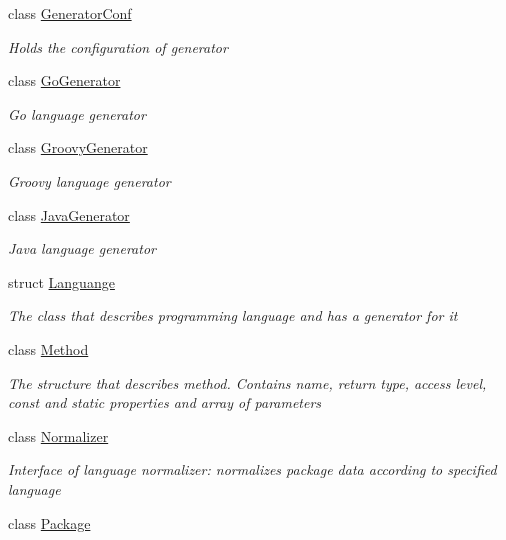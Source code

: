 \begin{DoxyCompactItemize}
class \mbox{\hyperlink{classCodeGen_1_1generators_1_1GeneratorConf}{Generator\+Conf}}
\begin{DoxyCompactList}\small\item\em Holds the configuration of generator \end{DoxyCompactList}\item 
class \mbox{\hyperlink{classCodeGen_1_1generators_1_1GoGenerator}{Go\+Generator}}
\begin{DoxyCompactList}\small\item\em Go language generator \end{DoxyCompactList}\item 
class \mbox{\hyperlink{classCodeGen_1_1generators_1_1GroovyGenerator}{Groovy\+Generator}}
\begin{DoxyCompactList}\small\item\em Groovy language generator \end{DoxyCompactList}\item 
class \mbox{\hyperlink{classCodeGen_1_1generators_1_1JavaGenerator}{Java\+Generator}}
\begin{DoxyCompactList}\small\item\em Java language generator \end{DoxyCompactList}\item 
struct \mbox{\hyperlink{structCodeGen_1_1generators_1_1Languange}{Languange}}
\begin{DoxyCompactList}\small\item\em The class that describes programming language and has a generator for it \end{DoxyCompactList}\item 
class \mbox{\hyperlink{classCodeGen_1_1generators_1_1Method}{Method}}
\begin{DoxyCompactList}\small\item\em The structure that describes method. Contains name, return type, access level, const and static properties and array of parameters \end{DoxyCompactList}\item 
class \mbox{\hyperlink{classCodeGen_1_1generators_1_1Normalizer}{Normalizer}}
\begin{DoxyCompactList}\small\item\em Interface of language normalizer\+: normalizes package data according to specified language \end{DoxyCompactList}\item 
class \mbox{\hyperlink{classCodeGen_1_1generators_1_1Package}{Package}}

\end{DoxyCompactItemize}
